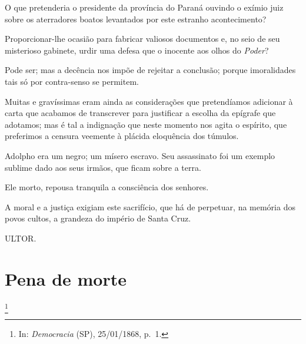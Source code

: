 O que pretenderia o presidente da província do Paraná ouvindo o exímio
juiz sobre os aterradores boatos levantados por este estranho
acontecimento?

Proporcionar-lhe ocasião para fabricar valiosos documentos e, no seio de
seu misterioso gabinete, urdir uma defesa que o inocente aos olhos do
\emph{Poder}?

Pode ser; mas a decência nos impõe de rejeitar a conclusão; porque
imoralidades tais só por contra-senso se permitem.

Muitas e gravíssimas eram ainda as considerações que pretendíamos
adicionar à carta que acabamos de transcrever para justificar a escolha
da epígrafe que adotamos; mas é tal a indignação que neste momento nos
agita o espírito, que preferimos a censura veemente à plácida eloquência
dos túmulos.

Adolpho era um negro; um mísero escravo. Seu assassinato foi um exemplo
sublime dado aos seus irmãos, que ficam sobre a terra.

Ele morto, repousa tranquila a consciência dos senhores.

A moral e a justiça exigiam este sacrifício, que há de perpetuar, na
memória dos povos cultos, a grandeza do império de Santa Cruz.

ULTOR.

\chapter{Pena de morte}\footnote{In: \emph{Democracia} (SP), 25/01/1868,
  p.~1.}

